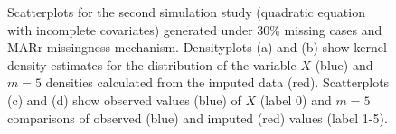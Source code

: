 \documentclass[12pt, fullpage, a4paper]{article}
\begin{document}
\begin{figure}
\begin{center}
{{			}
		}
	\end{center}
	\caption{Scatterplots for the second simulation study (quadratic equation with incomplete covariates) generated under 30\% missing cases and MARr missingness mechanism. Densityplots (a) and (b) show kernel density estimates for the distribution of the variable $X$ (blue) and $m = 5$ densities calculated from the imputed data (red). Scatterplots (c) and (d) show observed values (blue) of $X$ (label 0) and $m = 5$ comparisons of observed (blue) and imputed (red) values (label 1-5).}
	\label{fig6_7}
\end{figure}
\end{document}

